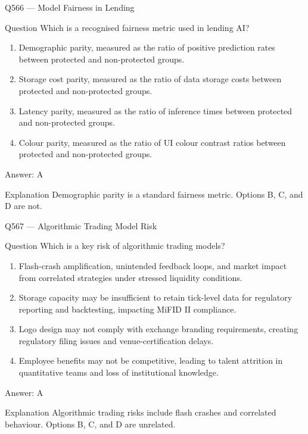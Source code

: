 \documentclass[aspectratio=169,8pt]{beamer}
\begin{document}
	
	\begin{frame}{Q566 --- Model Fairness in Lending}
		\begin{block}{Question}
			Which is a recognised fairness metric used in lending AI?
			\begin{enumerate}
				\item Demographic parity, measured as the ratio of positive prediction rates between protected and non-protected groups.
				\item Storage cost parity, measured as the ratio of data storage costs between protected and non-protected groups.
				\item Latency parity, measured as the ratio of inference times between protected and non-protected groups.
				\item Colour parity, measured as the ratio of UI colour contrast ratios between protected and non-protected groups.
			\end{enumerate}
		\end{block}
		\begin{exampleblock}{Answer: A}\end{exampleblock}
		\begin{block}{Explanation}
			Demographic parity is a standard fairness metric. Options B, C, and D are not.
		\end{block}
	\end{frame}
	
	\begin{frame}{Q567 --- Algorithmic Trading Model Risk}
		\begin{block}{Question}
			Which is a key risk of algorithmic trading models?
			\begin{enumerate}
				\item Flash-crash amplification, unintended feedback loops, and market impact from correlated strategies under stressed liquidity conditions.
				\item Storage capacity may be insufficient to retain tick-level data for regulatory reporting and backtesting, impacting MiFID II compliance.
				\item Logo design may not comply with exchange branding requirements, creating regulatory filing issues and venue-certification delays.
				\item Employee benefits may not be competitive, leading to talent attrition in quantitative teams and loss of institutional knowledge.
			\end{enumerate}
		\end{block}
		\begin{exampleblock}{Answer: A}\end{exampleblock}
		\begin{block}{Explanation}
			Algorithmic trading risks include flash crashes and correlated behaviour. Options B, C, and D are unrelated.
		\end{block}
	\end{frame}
	
\end{document}
